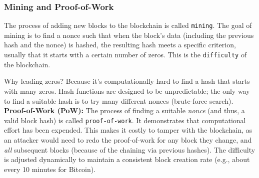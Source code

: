 \begin{center}
\end{center}

\subsubsection{Mining and Proof-of-Work}

The process of adding new blocks to the blockchain is called \texttt{mining}. The goal of mining is to find a nonce such that when the block's data (including the previous hash and the nonce) is hashed, the resulting hash meets a specific criterion, usually that it starts with a certain number of zeros.  This is the \texttt{difficulty} of the blockchain.

Why leading zeros? Because it's computationally hard to find a hash that starts with many zeros.  Hash functions are designed to be unpredictable; the only way to find a suitable hash is to try many different nonces (brute-force search).\\

\noindent \textbf{Proof-of-Work (PoW):} The process of finding a suitable \textit{nonce} (and thus, a valid block hash) is called \texttt{proof-of-work}. It demonstrates that computational effort has been expended. This makes it costly to tamper with the blockchain, as an attacker would need to redo the proof-of-work for any block they change, and \textit{all} subsequent blocks (because of the chaining via previous hashes).  The difficulty is adjusted dynamically to maintain a consistent block creation rate (e.g., about every 10 minutes for Bitcoin).\\

